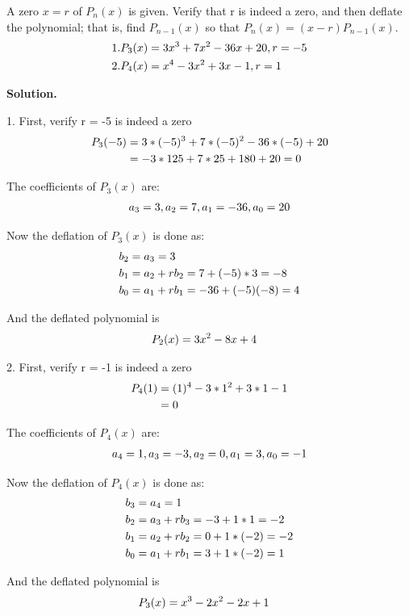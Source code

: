 \begin{exercise}{2} %
A zero $x = r$ of $P_n(x)$ is given. Verify that r is indeed a zero, and then deflate the polynomial; that is, find $P_{n-1}(x)$ so that $P_n(x) = (x-r)P_{n-1}(x)$.
\begin{align}
1. P_3(x) &= 3x^3 + 7x^2 - 36x + 20, r = -5 \notag \\
2. P_4(x) &= x^4 - 3x^2 + 3x - 1, r = 1 \notag
\end{align}

\textbf{Solution.}

1. First, verify r = -5 is indeed a zero
\begin{align}
P_3(-5) &= 3*(-5)^3 + 7*(-5)^2 - 36*(-5) + 20 \notag \\
&=-3*125 + 7*25 + 180 + 20 = 0 \notag 
\end{align}

The coefficients of $P_3(x)$ are:
\begin{align}
a_3 = 3, a_2 = 7, a_1 = -36, a_0 = 20 \notag 
\end{align}

Now the deflation of $P_3(x)$ is done as: 
\begin{align}
b_2 &= a_3 = 3 \notag \\ 
b_1 &= a_2 + rb_2 = 7 + (-5)*3 = -8 \notag \\
b_0 &= a_1 + rb_1 = -36 + (-5)(-8) = 4 \notag 
\end{align}

And the deflated polynomial is
\begin{align}
P_2(x) &= 3x^2 - 8x + 4 \notag 
\end{align}

2. First, verify r = -1 is indeed a zero
\begin{align}
P_4(1) &= (1)^4 - 3*1^2 + 3* 1 - 1 \notag \\
&= 0 \notag
\end{align}

The coefficients of $P_4(x)$ are:
\begin{align}
a_4 = 1, a_3 = -3, a_2 = 0, a_1 = 3, a_0 = -1 \notag 
\end{align}

Now the deflation of $P_4(x)$ is done as: 
\begin{align}
b_3 &= a_4 = 1 \notag \\ 
b_2 &= a_3 + rb_3 = -3 + 1*1 = -2 \notag \\ 
b_1 &= a_2 + rb_2 = 0 + 1*(-2) = -2 \notag \\
b_0 &= a_1 + rb_1 = 3 + 1*(-2) = 1 \notag
\end{align}


And the deflated polynomial is
\begin{align}
P_3(x) &= x^3 - 2x^2 - 2x + 1 \notag 
\end{align}
\end{exercise}


